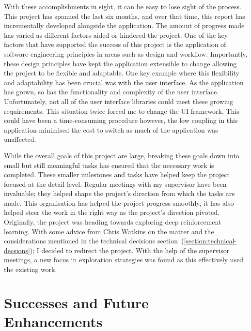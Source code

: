 \documentclass[]{final_report}
\begin{document}
With these accomplishments in sight, it can be easy to lose sight of the process. This project has spanned the last six months, and over that time, this report has incrementally developed alongside the application. The amount of progress made has varied as different factors aided or hindered the project. One of the key factors that have supported the success of this project is the application of software engineering principles in areas such as design and workflow. Importantly, these design principles have kept the application extensible to change allowing the project to be flexible and adaptable. One key example where this flexibility and adaptability has been crucial was with the user interface. As the application has grown, so has the functionality and complexity of the user interface. Unfortunately, not all of the user interface libraries could meet these growing requirements. This situation twice forced me to change the UI framework. This could have been a time-consuming procedure however, the low coupling in this application minimised the cost to switch as much of the application was unaffected. 

While the overall goals of this project are large, breaking these goals down into small but still meaningful tasks has ensured that the necessary work is completed. These smaller milestones and tasks have helped keep the project focused at the detail level. Regular meetings with my supervisor have been invaluable; they helped shape the project's direction from which the tasks are made. This organisation has helped the project progress smoothly, it has also helped steer the work in the right way as the project's direction pivoted. Originally, the project was heading towards exploring deep reinforcement learning. With some advice from Chris Watkins on the matter and the considerations mentioned in the technical decisions section~(\ref{section:technical-decsions}); I decided to redirect the project. With the help of the supervisor meetings, a new focus in exploration strategies was found as this effectively used the existing work. 
\newpage
\section{Successes and Future Enhancements}
\end{document}
